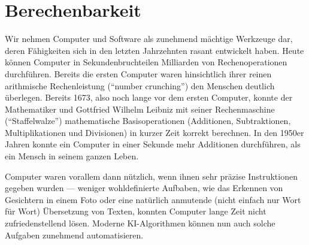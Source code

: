 \chapter{Berechenbarkeit}

Wir nehmen Computer und Software als zunehmend mächtige Werkzeuge dar, deren Fähigkeiten sich in den letzten Jahrzehnten rasant entwickelt haben.
Heute können Computer in Sekundenbruchteilen Milliarden von Rechenoperationen durchführen. Bereits die ersten Computer waren hinsichtlich ihrer reinen arithmische Rechenleistung (\enquote{number crunching}) den Menschen deutlich überlegen. Bereits 1673, also noch lange vor dem ersten Computer, konnte der Mathematiker und Gottfried Wilhelm Leibniz mit seiner Rechenmaschine (\enquote{Staffelwalze}) mathematische Basisoperationen (Additionen, Subtraktionen, Multiplikationen und Divisionen) in kurzer Zeit korrekt berechnen. In den 1950er Jahren konnte ein Computer in einer Sekunde mehr Additionen durchführen, als ein Mensch in seinem ganzen Leben.

Computer waren vorallem dann nützlich, wenn ihnen sehr präzise Instruktionen gegeben wurden --- weniger wohldefinierte Aufbaben, wie das Erkennen von Gesichtern in einem Foto oder eine natürlich anmutende (nicht einfach nur Wort für Wort) Übersetzung von Texten, konnten Computer lange Zeit nicht zufriedenstellend lösen. Moderne KI-Algorithmen können nun auch solche Aufgaben zunehmend automatisieren.





